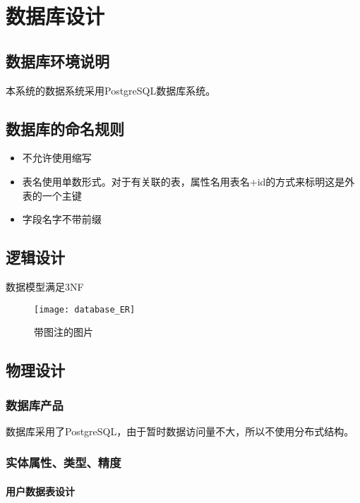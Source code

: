 \chapter{数据库设计}
\section{数据库环境说明}
本系统的数据系统采用PostgreSQL数据库系统。


\section{数据库的命名规则}
\begin{itemize}
	\item 不允许使用缩写
	\item 表名使用单数形式。对于有关联的表，属性名用表名+id的方式来标明这是外表的一个主键
	\item 字段名字不带前缀
\end{itemize}

\section{逻辑设计}

数据模型满足3NF\\
\newpage

\begin{figure}[ht]
	\centering
	\texttt{[image: database\_ER]}
	\caption{带图注的图片}\label{fig:noted-figure}

\end{figure}

\section{物理设计}

\subsection{数据库产品}

数据库采用了PostgreSQL，由于暂时数据访问量不大，所以不使用分布式结构。

\subsection{实体属性、类型、精度}

\subsubsection{用户数据表设计}

